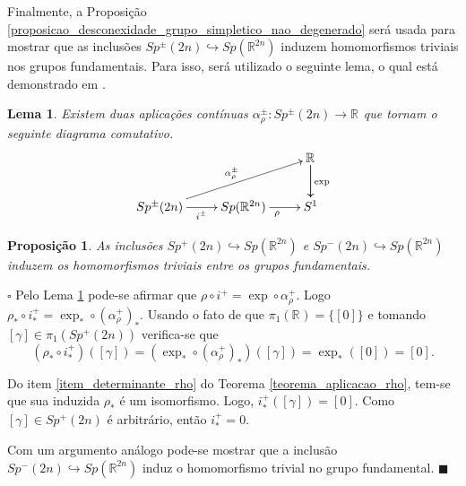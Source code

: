 \documentclass[12pt]{book}
\newtheorem{lema}[teorema]{Lema}
\newtheorem{proposicao}[teorema]{Proposição}
\newenvironment{prova}[1]{$\square$ #1}{\hfill$\blacksquare$}
\newcommand{\classe}[1]{[#1]}
\newcommand{\grupofundamental}[1]{\pi_{1}(#1)}
\newcommand{\gruposimpletico}[1]{Sp(#1)}
\newcommand{\gruposimpleticonaodegenerado}[1]{Sp^{#1}(2n)}
\newcommand{\real}[1]{\mathbb{R}^{#1}}
\newcommand{\reta}{\real{}}
\begin{document}
	
	Finalmente, a Proposição \ref{proposicao_desconexidade_grupo_simpletico_nao_degenerado} será usada para mostrar que as inclusões $\gruposimpleticonaodegenerado{\pm} \hookrightarrow \gruposimpletico{\real{2n}}$ induzem homomorfismos triviais nos grupos fundamentais. Para isso, será utilizado o seguinte lema, o qual está demonstrado em \cite{audi_floer_homology}.
	
	\begin{lema}\label{lema_levantamento_rho}
		Existem duas aplicações contínuas $\alpha^{\pm}_{\rho}: \gruposimpleticonaodegenerado{\pm}\to \reta$ que tornam o seguinte diagrama comutativo.
		$$
		\xymatrix{
			& & \real{}\ar[d]\ar[d]^{\text{exp}}
			\\
			\gruposimpleticonaodegenerado{\pm}\ar[urr]^{\alpha^{\pm}_{\rho}} \ar[r]_{i^{\pm}} & \gruposimpletico{\real{2n}} \ar[r]_{\rho} & S^{1}
		}
		$$	
		
	\end{lema}
	
	\begin{proposicao}\label{proposicao_homomorfismo_trivial_grupos_simpletico}
		As inclusões $\gruposimpleticonaodegenerado{+} \hookrightarrow \gruposimpletico{\real{2n}}$ e $\gruposimpleticonaodegenerado{-} \hookrightarrow \gruposimpletico{\real{2n}}$ induzem os homomorfismos triviais entre os grupos fundamentais.
	\end{proposicao}
	\begin{prova}
		Pelo Lema \ref{lema_levantamento_rho} pode-se afirmar que $\rho\circ i^{+} = \exp\circ \alpha^{+}_{\rho}$. Logo $\rho_{*}\circ i^{+}_{*} = \exp_{*}\circ (\alpha^{+}_{\rho})_{*}$. Usando o fato de que $\grupofundamental{\reta}=\{\classe{0}\}$ e tomando $\classe{\gamma}\in \grupofundamental{\gruposimpleticonaodegenerado{+}}$ verifica-se que 
		$$
		(\rho_{*}\circ i^{+}_{*})(\classe{\gamma}) = (\exp_{*}\circ (\alpha^{+}_{\rho})_{*})(\classe{\gamma}) = \exp_{*}(\classe{0})=\classe{0}.
		$$
		
		Do item \ref{item_determinante_rho} do Teorema \ref{teorema_aplicacao_rho}, tem-se que sua induzida $\rho_{*}$ é um isomorfismo. Logo, $	i^{+}_{*}(\classe{\gamma})=\classe{0}$. Como $\classe{\gamma}\in \gruposimpleticonaodegenerado{+}$ é arbitrário, então $i^{+}_{*} = 0$.
		
		Com um argumento análogo pode-se mostrar que a inclusão $\gruposimpleticonaodegenerado{-}\hookrightarrow \gruposimpletico{\real{2n}}$ induz o homomorfismo trivial no grupo fundamental.
	\end{prova}
	
\end{document}
